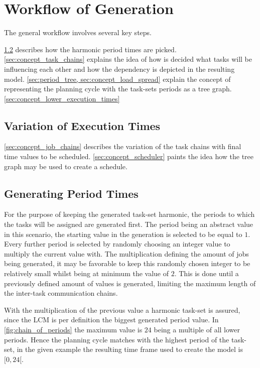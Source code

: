 \cite{dar-tzenpengAssignmentSchedulingCommunicating1997}


\section{Workflow of Generation}\label{sec:concept}
The general workflow involves several key steps.

\cref{sec:generating_period_times} describes how the harmonic period times are picked.
\cref{sec:concept_task_chains} explains the idea of how is decided what tasks will be influencing each other and how the dependency is depicted in the resulting model.
\cref{sec:period_tree, sec:concept_load_spread} explain the concept of representing the planning cycle with the task-sets periods as a tree graph.
\cref{sec:concept_lower_execution_times} \subsection{Variation of Execution Times}
\cref{sec:concept_job_chains} describes the variation of the task chains with final time values to be scheduled.
\cref{sec:concept_scheduler} paints the idea how the tree graph may be used to create a schedule.

\subsection{Generating Period Times}\label{sec:generating_period_times}
For the purpose of keeping the generated task-set harmonic, the periods to which the tasks will be assigned are generated first.
The period being an abstract value in this scenario, the starting value in the generation is selected to be equal to $1$.
Every further period is selected by randomly choosing an integer value to multiply the current value with.
The multiplication defining the amount of jobs being generated, it may be favorable to keep this randomly chosen integer to be relatively small whilst being at minimum the value of $2$. 
This is done until a previously defined amount of values is generated, limiting the maximum length of the inter-task communication chains.

With the multiplication of the previous value a harmonic task-set is assured, since the \ac{LCM} is per definition the biggest generated period value.
In \cref{fig:chain_of_periods} the maximum value is $24$ being a multiple of all lower periods.
Hence the planning cycle matches with the highest period of the task-set, in the given example the resulting time frame used to create the model is $[0,24[$.

